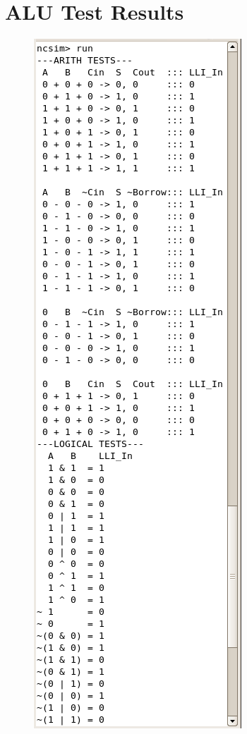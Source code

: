 \chapter{ALU Test Results}
\label{chap:ALUTestResults}

\begin{figure}[h]
	\centering
	\includegraphics[scale=0.72]{results/ALUSliceA.png}

\end{figure}
